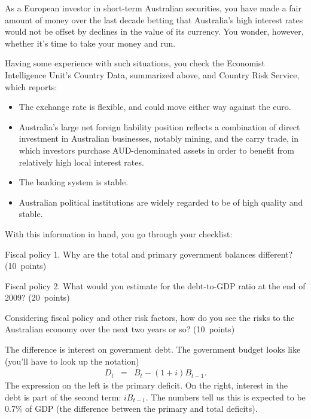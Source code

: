 \documentclass[letterpaper,12pt]{exam}
\begin{document}
\begin{questions}
As a European investor in short-term Australian securities,
you have made a fair amount of money over the last decade
betting that Australia's high interest rates would not
be offset by declines in the value of its currency.
You wonder, however, whether it's time to take your money
and run.

Having some experience with such situations,
you check the Economist Intelligence Unit's Country Data,
summarized above,
and Country Risk Service,
which reports:
%
\begin{itemize}
\item The exchange rate is flexible, and could move either way against
the euro.
\item Australia's large net foreign liability position reflects
a combination of direct investment in Australian businesses,
notably mining,
and the carry trade,
in which investors purchase AUD-denominated assets
in order to benefit from relatively high local interest rates.
\item The banking system is stable.
\item Australian political institutions are widely regarded to be
of high quality and stable.
\end{itemize}

With this information in hand, you go through your checklist:
%
\begin{parts}
\item Fiscal policy 1.
Why are the total and primary government balances different?
(10~points)

\item Fiscal policy 2.
What would you estimate for the debt-to-GDP ratio
at the end of 2009?
(20~points)

\item Considering fiscal policy and other risk factors,
how do you see the risks to the Australian economy
over the next two years or so?
(10~points)
\end{parts}

\begin{solution}
\begin{parts}
\item The difference is interest on government debt.
The government budget looks like (you'll have to look
up the notation)
\begin{eqnarray*}
        D_t &=&  B_t - (1+i)B_{t-1} .
\end{eqnarray*}
The expression on the left is the primary deficit.
On the right, interest in the debt is part of the second
term:  $ i B_{t-1}$.
The numbers tell us this is expected to be 0.7\% of GDP
(the difference between the primary and total deficits).


\end{parts}
\end{solution}
\end{questions}
\end{document}
